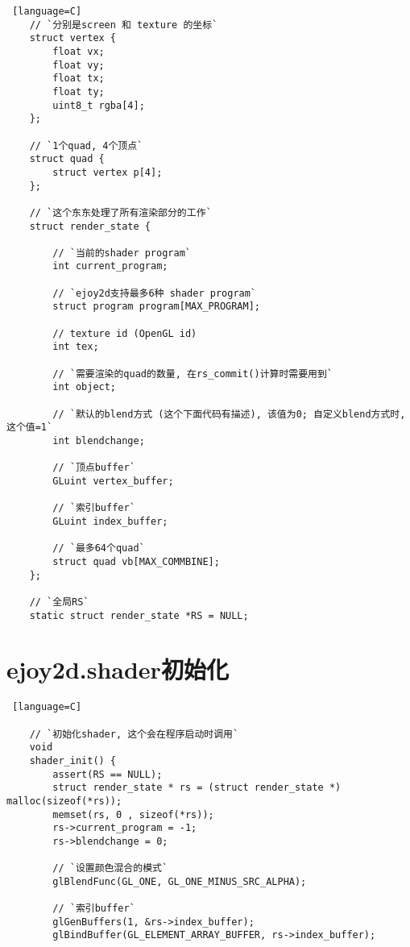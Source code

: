  {
    \begin {lstlisting} [language=C]
    // `分别是screen 和 texture 的坐标`
    struct vertex {
        float vx;
        float vy;
        float tx;
        float ty;
        uint8_t rgba[4];
    };

    // `1个quad, 4个顶点`
    struct quad {
        struct vertex p[4];
    };

    // `这个东东处理了所有渲染部分的工作`
    struct render_state {

        // `当前的shader program`
        int current_program;

        // `ejoy2d支持最多6种 shader program`
        struct program program[MAX_PROGRAM];

        // texture id (OpenGL id)
        int tex;

        // `需要渲染的quad的数量, 在rs_commit()计算时需要用到`
        int object;

        // `默认的blend方式 (这个下面代码有描述), 该值为0; 自定义blend方式时, 这个值=1`
        int blendchange;

        // `顶点buffer`
        GLuint vertex_buffer;

        // `索引buffer`
        GLuint index_buffer;

        // `最多64个quad`
        struct quad vb[MAX_COMMBINE];
    };

    // `全局RS`
    static struct render_state *RS = NULL;
    \end {lstlisting}
}


\section* {\ZHH ejoy2d.shader初始化} {

    \begin {lstlisting} [language=C]

    // `初始化shader, 这个会在程序启动时调用`
    void
    shader_init() {
        assert(RS == NULL);
        struct render_state * rs = (struct render_state *) malloc(sizeof(*rs));
        memset(rs, 0 , sizeof(*rs));
        rs->current_program = -1;
        rs->blendchange = 0;

        // `设置颜色混合的模式`
        glBlendFunc(GL_ONE, GL_ONE_MINUS_SRC_ALPHA);

        // `索引buffer`
        glGenBuffers(1, &rs->index_buffer);
        glBindBuffer(GL_ELEMENT_ARRAY_BUFFER, rs->index_buffer);


\end{lstlisting}}
